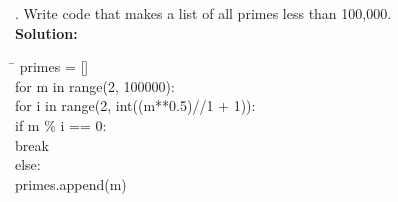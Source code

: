 \documentclass{article}
\newenvironment{code}{\begin{tcolorbox}\ttfamily}{\end{tcolorbox}}
\begin{document}
. Write code that makes a list of all primes less than 100,000.\\
\noindent \textbf{Solution:}
\begin{code}
\begin{tabbing}
	\hspace{5 cm} \= \hspace{5 cm} \kill
	primes = []\\
	for m in range(2, 100000):\\
	    \hspace{2 em}for i in range(2, int((m**0.5)//1 + 1)):\\
	        \hspace{4 em}if m \% i == 0:\\
	            \hspace{6 em}break\\
	    \hspace{2 em}else:\\
	        \hspace{4 em}primes.append(m)
	
\end{tabbing}
\end{code}
\end{document}
